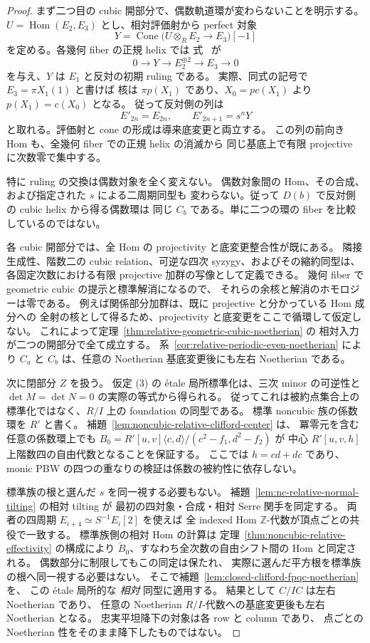 \begin{proof}
まず二つ目の cubic 開部分で、偶数軌道環が変わらないことを明示する。
$U=\operatorname{Hom}(E_2,E_3)$ とし、相対評価射から perfect 対象
\[
 Y=\operatorname{Cone}\bigl(U\otimes_RE_2\longrightarrow E_3\bigr)[-1]
\]
を定める。各幾何 fiber の正規 helix では
式~\cite[\texttt{eq:normal-ruling-evaluation}]{QuadricIntrinsic2026} が
\[
 0\longrightarrow Y\longrightarrow E_2^{\oplus2}
 \longrightarrow E_3\longrightarrow0
\]
を与え、$Y$ は $E_1$ と反対の初期 ruling である。
実際、同式の記号で $E_3=\pi X_1(1)$ と書けば
核は $\pi p(X_1)$ であり、$X_0=pc(X_1)$ より
$p(X_1)=c(X_0)$ となる。
従って反対側の列は
\[
 E'_{2n}=E_{2n},\qquad E'_{2n+1}=s^nY
\]
と取れる。評価射と cone の形成は導来底変更と両立する。
この列の前向き Hom も、全幾何 fiber での正規 helix の消滅から
同じ基底上で有限 projective に次数零で集中する。

特に ruling の交換は偶数対象を全く変えない。
偶数対象間の Hom、その合成、および指定された $s$ による二周期同型も
変わらない。従って $D(b)$ で反対側の cubic helix から得る偶数環は
同じ $C_b$ である。単に二つの環の fiber を比較しているのではない。

各 cubic 開部分では、全 Hom の projectivity と底変更整合性が既にある。
隣接生成性、階数二の cubic relation、可逆な四次 syzygy、およびその縮約同型は、
各固定次数における有限 projective 加群の写像として定義できる。
幾何 fiber で geometric cubic の提示と標準解消になるので、
それらの余核と解消のホモロジーは零である。
例えば関係部分加群は、既に projective と分かっている Hom 成分への
全射の核として得るため、projectivity と底変更をここで循環して仮定しない。
これによって定理~\ref{thm:relative-geometric-cubic-noetherian} の
相対入力が二つの開部分で全て成立する。
系~\ref{cor:relative-periodic-even-noetherian} により
$C_a$ と $C_b$ は、任意の Noetherian 基底変更後にも左右 Noetherian である。

次に閉部分 $Z$ を扱う。
仮定 (3) の \'etale 局所標準化は、三次 minor の可逆性と
$\det M=\det N=0$ の実際の等式から得られる。
従ってこれは被約点集合上の標準化ではなく、$R/I$ 上の foundation の同型である。
標準 noncubic 族の係数環を $R'$ と書く。
補題~\ref{lem:noncubic-relative-clifford-center} は、
冪零元を含む任意の係数環上でも
$B_0=R'[u,v]\langle c,d\rangle/(c^2-f_1,d^2-f_2)$ が
中心 $R'[u,v,h]$ 上階数四の自由代数となることを保証する。
ここでは $h=cd+dc$ であり、
monic PBW の四つの重なりの検証は係数の被約性に依存しない。

標準族の根と選んだ $s$ を同一視する必要もない。
補題~\ref{lem:nc-relative-normal-tilting} の相対 tilting が
最初の四対象・合成・相対 Serre 関手を同定する。
両者の四周期 $E_{i+4}\simeq S^{-1}E_i[2]$ を使えば
全 indexed Hom $\mathbb Z$-代数が頂点ごとの共役で一致する。
標準族側の相対 Hom の計算は
定理~\ref{thm:noncubic-relative-effectivity} の構成により
$\check B_0$、すなわち全次数の自由シフト間の Hom と同定される。
偶数部分に制限してもこの同定は保たれ、
実際に選んだ平方根を標準族の根へ同一視する必要はない。
そこで補題~\ref{lem:closed-clifford-fpqc-noetherian} を、
この \'{e}tale 局所的な \emph{相対} 同型に適用する。
結果として $C/IC$ は左右 Noetherian であり、
任意の Noetherian $R/I$-代数への基底変更後も左右 Noetherian となる。
忠実平坦降下の対象は各 row と column であり、
点ごとの Noetherian 性をそのまま降下したものではない。


\end{proof}

